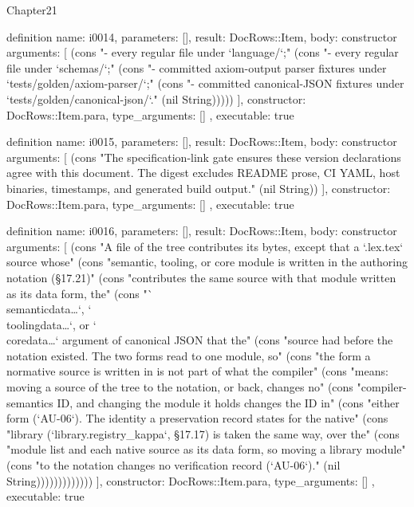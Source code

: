 \begin{lexlean}{Chapter21}
\begin{semanticmodule}
definition{
  name: i0014,
  parameters: [],
  result: DocRows::Item,
  body: constructor{
    arguments: [
      (cons "- every regular file under `language/`;" (cons "- every regular file under `schemas/`;" (cons "- committed axiom-output parser fixtures under `tests/golden/axiom-parser/`;" (cons "- committed canonical-JSON fixtures under `tests/golden/canonical-json/`." (nil String)))))
    ],
    constructor: DocRows::Item.para,
    type_arguments: []
  },
  executable: true
}

definition{
  name: i0015,
  parameters: [],
  result: DocRows::Item,
  body: constructor{
    arguments: [
      (cons "The specification-link gate ensures these version declarations agree with this document. The digest excludes README prose, CI YAML, host binaries, timestamps, and generated build output." (nil String))
    ],
    constructor: DocRows::Item.para,
    type_arguments: []
  },
  executable: true
}

definition{
  name: i0016,
  parameters: [],
  result: DocRows::Item,
  body: constructor{
    arguments: [
      (cons "A file of the tree contributes its bytes, except that a `.lex.tex` source whose" (cons "semantic, tooling, or core module is written in the authoring notation (§17.21)" (cons "contributes the same source with that module written as its data form, the" (cons "`\\semanticdata{…}`, `\\toolingdata{…}`, or `\\coredata{…}` argument of canonical JSON that the" (cons "source had before the notation existed. The two forms read to one module, so" (cons "the form a normative source is written in is not part of what the compiler" (cons "means: moving a source of the tree to the notation, or back, changes no" (cons "compiler-semantics ID, and changing the module it holds changes the ID in" (cons "either form (`AU-06`). The identity a preservation record states for the native" (cons "library (`library.registry_kappa`, §17.17) is taken the same way, over the" (cons "module list and each native source as its data form, so moving a library module" (cons "to the notation changes no verification record (`AU-06`)." (nil String)))))))))))))
    ],
    constructor: DocRows::Item.para,
    type_arguments: []
  },
  executable: true
}


\end{semanticmodule}
\end{lexlean}
